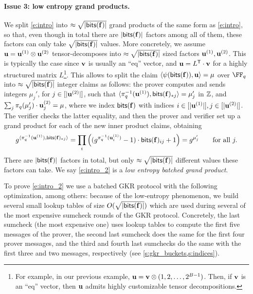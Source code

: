 \paragraph{Issue 3: low entropy grand products.} We split  \eqref{e:intro} into $\approx\sqrt{|\mathsf{bits}(\mathbf{f})|}$ grand products of the same form as \eqref{e:intro}, so that, even though in total there are $|\mathsf{bits}(\mathbf{f})|$ factors among all of them, these factors can only take $\sqrt{|\mathsf{bits}(\mathbf{f})|}$ values. More concretely, we assume $\mathbf{u}=\mathbf{u}^{(1)} \otimes \mathbf{u}^{(2)}$ tensor-decomposes into $\approx \sqrt{|\mathsf{bits}(\mathbf{f})|}$ sized factors $\mathbf{u}^{(1)}, \mathbf{u}^{(2)}$. This is typically the case since $\mathbf{v}$ is usually an ``eq'' vector, and $\mathbf{u}=L^{\mathsf{T}}\cdot \mathbf{v}$ for a highly structured matrix $L$\footnote{For example, in our previous example, $\mathbf{u}= \mathbf{v} \otimes (1,2,\ldots, 2^{B-1})$. Then, if $\mathbf{v}$ is an ``eq'' vector, then $\mathbf{u}$ admits highly customizable tensor decompositions.}. This allows to split the claim $\langle \psi(\mathsf{bits}(\mathbf{f})), \mathbf{u} \rangle = \mu$ over $\FF_q$ into $\approx \sqrt{|\mathsf{bits}(\mathbf{f})|}$ integer claims as follows: the prover computes and sends integers $\mu_j'$, for $j\in [|\mathbf{u}^{(2)}|]$, such that $\langle \pi_q^{-1}(\mathbf{u}^{(1)}), \mathsf{bits}(\mathbf{f})_{*j}\rangle = \mu_j'$ in $\mathbb{Z}$, and $\sum_{j} \pi_q(\mu_j') \cdot \mathbf{u}_j^{(2)} = \mu$, where we index   $\mathsf{bits}(\mathbf{f})$ with indices $i\in [|\mathbf{u}^{(1)}|], j\in [|\mathbf{u}^{(2)}|]$. The verifier checks the latter equality, and then the prover and verifier set up a grand product for each of the new inner product claims, obtaining 
  \begin{equation}\label{e:intro_2}
         g^{\langle \pi_q^{-1}(\mathbf{u}^{(1)}), \mathsf{bits}(\mathbf{f})_{*j}\rangle} = \prod_{i} \left((g^{\pi_q^{-1}(\mathbf{u}_i^{(1)})} -1) \cdot \mathsf{bits}(\mathbf{f})_{ij} + 1\right) = g^{\mu_j'} \qquad \text{for all } j.
         \end{equation}
There are $|\mathsf{bits}(\mathbf{f})|$ factors in total, but only $\approx \sqrt{|\mathsf{bits}(\mathbf{f})|}$ different values these factors can take. We say \eqref{e:intro_2} is a \emph{low entropy batched grand product}. 

To prove \eqref{e:intro_2} we use a batched GKR protocol with the following  optimization, among others: because of the low-entropy phenomenon, we build several small lookup tables of size $O(\sqrt{|\mathsf{bits}(\mathbf{f})|})$ which are used during several of the most expensive sumcheck rounds of the GKR protocol. \iflncs \else Concretely, the last sumcheck (the most expensive one) uses  lookup tables to compute the first five messages of the prover,  the second last sumcheck does the same for the first four prover messages, and the third and fourth last sumchecks do the same with the first three and two messages, respectively (see \cref{s:gkr_buckets,s:indices}).\fi

